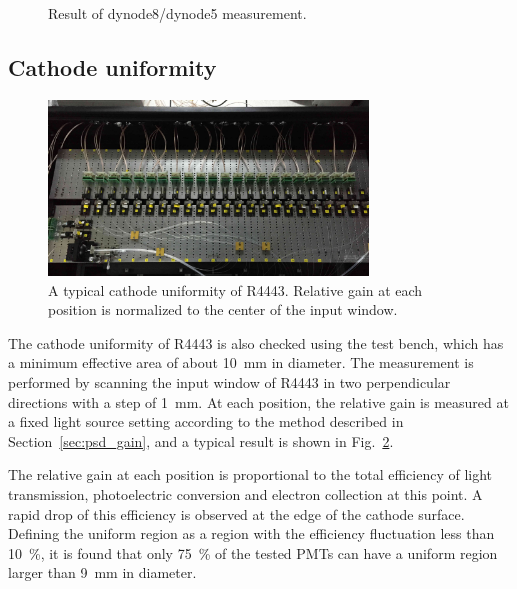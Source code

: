 \documentclass{nst}
\begin{document}
\begin{figure}[!tb]
	\caption{Result of dynode8/dynode5 measurement.}
	\label{fig:FIG6}
\end{figure}

\subsection{Cathode uniformity}
\label{sec:psd_cathodescan}

\begin{figure}[!tb]
	\centering
	\includegraphics[width=85mm]{FIG7}
	\caption{A typical cathode uniformity of R4443.
		Relative gain at each position is normalized to the center of the input window.}
	\label{fig:FIG7}
\end{figure} 

The cathode uniformity of R4443 is also checked using the test bench, which has a minimum effective area of about \SI{10}{\milli\meter} in diameter.
The measurement is performed by scanning the input window of R4443 in two perpendicular directions with a step of \SI{1}{\milli\meter}.
At each position, the relative gain is measured at a fixed light source setting according to the method described in Section~\ref{sec:psd_gain}, and a typical result is shown in Fig.~\ref{fig:FIG7}.

The relative gain at each position is proportional to the total efficiency of light transmission, photoelectric conversion and electron collection at this point.
A rapid drop of this efficiency is observed at the edge of the cathode surface. 
Defining the uniform region as a region with the efficiency fluctuation less than \SI{10}{\percent}, it is found that only \SI{75}{\percent} of the tested PMTs can have a uniform region larger than \SI{9}{\milli\meter} in diameter. 
\end{document}
